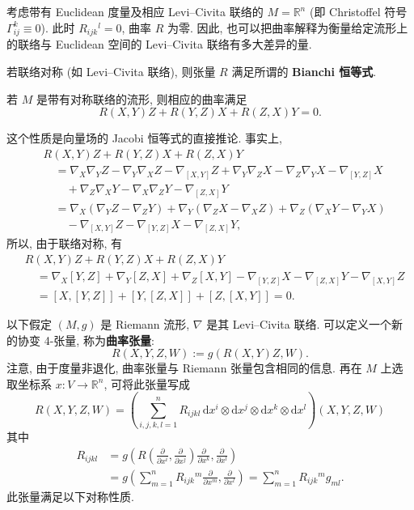 \begin{RiemannExample}\label{ex:curvature-of-euclidean-space}
考虑带有 Euclidean 度量及相应 Levi–Civita 联络的 $M=\mathbb{R}^n$ (即 Christoffel 符号 $\Gamma_{ij}^k\equiv0$). 此时 $R_{ijk}{}^l=0$, 曲率 $R$ 为零. 因此, 也可以把曲率解释为衡量给定流形上的联络与 Euclidean 空间的 Levi–Civita 联络有多大差异的量.
\end{RiemannExample}

若联络对称 (如 Levi–Civita 联络), 则张量 $R$ 满足所谓的 \textbf{Bianchi 恒等式}.

\begin{RiemannProposition}\label{prop:first-bianchi-identity}
若 $M$ 是带有对称联络的流形, 则相应的曲率满足
\[
  R(X,Y)Z+R(Y,Z)X+R(Z,X)Y=0.
\]
\end{RiemannProposition}

\begin{RiemannProof}
这个性质是向量场的 Jacobi 恒等式的直接推论. 事实上,
\begin{align*}
  &R(X,Y)Z+R(Y,Z)X+R(Z,X)Y\\
  &\quad=\nabla_X\nabla_YZ-\nabla_Y\nabla_XZ-\nabla_{[X,Y]}Z
   +\nabla_Y\nabla_ZX-\nabla_Z\nabla_YX-\nabla_{[Y,Z]}X\\
  &\qquad{}+\nabla_Z\nabla_XY-\nabla_X\nabla_ZY-\nabla_{[Z,X]}Y\\
  &\quad=\nabla_X(\nabla_YZ-\nabla_ZY)+\nabla_Y(\nabla_ZX-\nabla_XZ)
    +\nabla_Z(\nabla_XY-\nabla_YX)\\
  &\qquad{}-\nabla_{[X,Y]}Z-\nabla_{[Y,Z]}X-\nabla_{[Z,X]}Y,
\end{align*}
所以, 由于联络对称, 有
\begin{align*}
  &R(X,Y)Z+R(Y,Z)X+R(Z,X)Y\\
  &\quad=\nabla_X[Y,Z]+\nabla_Y[Z,X]+\nabla_Z[X,Y]
    -\nabla_{[Y,Z]}X-\nabla_{[Z,X]}Y-\nabla_{[X,Y]}Z\\
  &\quad=[X,[Y,Z]]+[Y,[Z,X]]+[Z,[X,Y]]=0.
\end{align*}
\end{RiemannProof}

以下假定 $(M,g)$ 是 Riemann 流形, $\nabla$ 是其 Levi–Civita 联络. 可以定义一个新的协变 4-张量, 称为\textbf{曲率张量}:
\[
  R(X,Y,Z,W):=g(R(X,Y)Z,W).
\]
注意, 由于度量非退化, 曲率张量与 Riemann 张量包含相同的信息. 再在 $M$ 上选取坐标系 $x:V\to\mathbb{R}^n$, 可将此张量写成
\[
  R(X,Y,Z,W)=\left(\sum_{i,j,k,l=1}^n R_{ijkl}\,\mathrm{d}x^i\otimes\mathrm{d}x^j
  \otimes\mathrm{d}x^k\otimes\mathrm{d}x^l\right)(X,Y,Z,W)
\]
其中
\begin{align*}
  R_{ijkl}
  &=g\left(R\left(\frac{\partial}{\partial x^i},\frac{\partial}{\partial x^j}\right)
       \frac{\partial}{\partial x^k},\frac{\partial}{\partial x^l}\right)\\
  &=g\left(\sum_{m=1}^n R_{ijk}{}^m\frac{\partial}{\partial x^m},
       \frac{\partial}{\partial x^l}\right)=\sum_{m=1}^n R_{ijk}{}^m g_{ml}.
\end{align*}
此张量满足以下对称性质.

